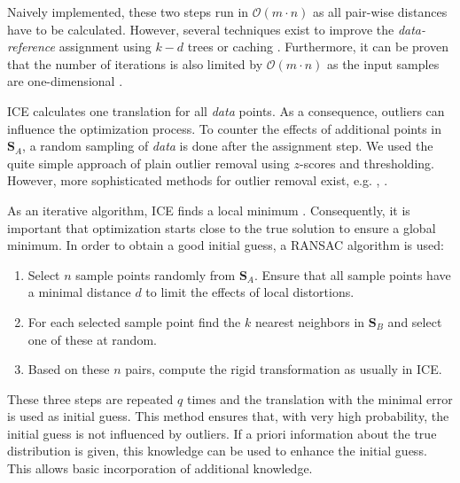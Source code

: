 \documentclass[conference]{IEEEtran}
\theoremstyle{examplestyle}
\begin{document}
Naively implemented, these two steps run in \(\mathcal{O}(m \cdot n)\) as all pair-wise distances have to be calculated. However, several techniques exist to improve the \textit{data-reference} assignment using \(k-d\) trees or caching \cite{Pomerleau2015}. Furthermore, it can be proven that the number of iterations is also limited by \(\mathcal{O}(m \cdot n)\) as the input samples are one-dimensional \cite{Ezra2008}.

\ac{ICE} calculates one translation for all \textit{data} points. As a consequence, outliers can influence the optimization process. To counter the effects of additional points in \(\pmb{S}_A\), a random sampling of \textit{data} is done after the assignment step. We used the quite simple approach of plain outlier removal using \(z\)-scores and thresholding. However, more sophisticated methods for outlier removal exist, e.g. \cite{Hontani2012}, \cite{Phillips2007}.


As an iterative algorithm, \ac{ICE} finds a local minimum \cite{Do2008}. Consequently, it is important that optimization starts close to the true solution to ensure a global minimum. In order to obtain a good initial guess, a \ac{RANSAC} \cite{Fischler1981} algorithm is used:
\begin{enumerate}
	\item Select \(n\) sample points randomly from \(\pmb{S}_A\). Ensure that all sample points have a minimal distance \(d\) to limit the effects of local distortions.
	\item For each selected sample point find the \(k\) nearest neighbors in \(\pmb{S}_B\) and select one of these at random.
	\item Based on these \(n\) pairs, compute the rigid transformation as usually in \ac{ICE}.
\end{enumerate}

These three steps are repeated \(q\) times and the translation with the minimal error is used as initial guess. This method ensures that, with very high probability, the initial guess is not influenced by outliers. If a priori information about the true distribution is given, this knowledge can be used to enhance the initial guess. This allows basic incorporation of additional knowledge.
\end{document}
